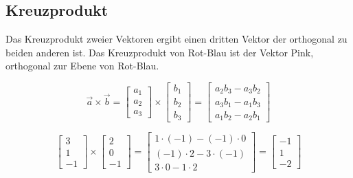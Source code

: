 \clearpage

\subsection{Kreuzprodukt}

Das Kreuzprodukt zweier Vektoren ergibt einen dritten Vektor der orthogonal
zu beiden anderen ist. Das Kreuzprodukt von Rot-Blau ist der Vektor Pink, orthogonal zur
Ebene von Rot-Blau.

\begin{equation*}
    \vec{a} \times \vec{b} =
    \begin{bmatrix}
        a_1 \\
        a_2 \\
        a_3
    \end{bmatrix} \times
    \begin{bmatrix}
        b_1 \\
        b_2 \\
        b_3
    \end{bmatrix} =
    \begin{bmatrix}
        a_2 b_3 - a_3 b_2 \\
        a_3 b_1 - a_1 b_3 \\
        a_1 b_2 - a_2 b_1
    \end{bmatrix}
\end{equation*}

\begin{equation*}
    \begin{bmatrix}
        3 \\
        1 \\
        -1
    \end{bmatrix} \times
    \begin{bmatrix}
        2 \\
        0 \\
        -1
    \end{bmatrix} =
    \begin{bmatrix}
        1 \cdot (-1) - (-1) \cdot 0 \\
        (-1) \cdot 2 - 3 \cdot (-1) \\
        3 \cdot 0 - 1 \cdot 2
    \end{bmatrix} =
    \begin{bmatrix}
        -1 \\
        1 \\
        -2
    \end{bmatrix}
\end{equation*}

